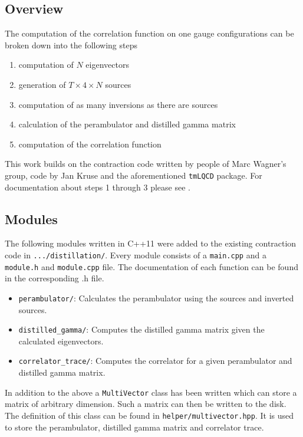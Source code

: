 \subsection{Overview}
    The computation of the correlation function on one gauge configurations can be broken down into the following steps
    \begin{enumerate}
        \item computation of $N$ eigenvectors
        \item generation of $T \times 4 \times N$ sources
        \item computation of as many inversions as there are sources
        \item calculation of the perambulator and distilled gamma matrix
        \item computation of the correlation function
    \end{enumerate}
    This work builds on the contraction code written by people of Marc Wagner's group, code by Jan Kruse and the aforementioned \verb+tmLQCD+ package. For documentation about steps 1 through 3 please see \cite{bachelor_thesis_jan}.



\subsection{Modules}
    The following modules written in C++11 were added to the existing contraction code in \verb+.../distillation/+. Every module consists of a \verb+main.cpp+ and a \verb+module.h+ and \verb+module.cpp+ file. The documentation of each function can be found in the corresponding .h file.  
    \begin{itemize}
        \item \verb+perambulator/+: Calculates the perambulator using the sources and inverted sources.
        \item \verb+distilled_gamma/+: Computes the distilled gamma matrix given the calculated eigenvectors.
        \item \verb+correlator_trace/+: Computes the correlator for a given perambulator and distilled gamma matrix.
    \end{itemize}
    
    In addition to the above a \verb+MultiVector+ class has been written which can store a matrix of arbitrary dimension. Such a matrix can then be written to the disk. The definition of this class can be found in \verb+helper/multivector.hpp+. It is used to store the perambulator, distilled gamma matrix and correlator trace.
    

